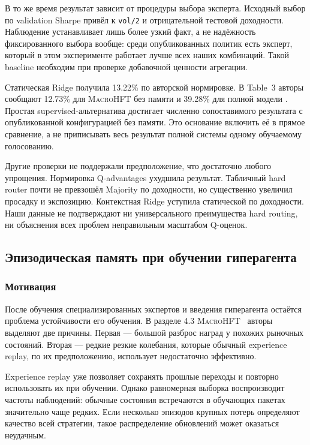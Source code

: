 \documentclass[9pt,a4paper,twocolumn]{extarticle}
\newcommand{\Macro}{\textsc{MacroHFT}}
\begin{document}
В то же время результат зависит от процедуры выбора эксперта. Исходный выбор по validation
Sharpe привёл к \texttt{vol/2} и отрицательной тестовой доходности. Наблюдение устанавливает
лишь более узкий факт, а не надёжность фиксированного выбора вообще: среди опубликованных
политик есть эксперт, который в этом эксперименте работает лучше всех наших комбинаций. Такой
baseline необходим при проверке добавочной ценности агрегации.

Статическая Ridge получила 13.22\% по авторской нормировке. В Table~3 авторы сообщают 12.73\%
для \Macro{} без памяти и 39.28\% для полной модели \cite{zong2024macrohft}. Простая
supervised-альтернатива достигает численно сопоставимого результата с опубликованной
конфигурацией без памяти. Это основание включить её в прямое сравнение, а не приписывать весь
результат полной системы одному обучаемому голосованию.

Другие проверки не поддержали предположение, что достаточно любого упрощения. Нормировка
Q-advantages ухудшила результат. Табличный hard router почти не превзошёл Majority по
доходности, но существенно увеличил просадку и экспозицию. Контекстная Ridge уступила
статической по доходности. Наши данные не подтверждают ни универсального преимущества hard
routing, ни объяснения всех проблем неправильным масштабом Q-оценок.

\subsection{Эпизодическая память при обучении гиперагента}
\label{sec:memory}

\subsubsection{Мотивация}

После обучения специализированных экспертов и введения гиперагента остаётся проблема
устойчивости его обучения. В разделе 4.3 \Macro{}~\cite{zong2024macrohft} авторы выделяют две
причины. Первая --- большой разброс наград у похожих рыночных состояний. Вторая --- редкие
резкие колебания, которые обычный experience replay, по их предположению, использует
недостаточно эффективно.

Experience replay уже позволяет сохранять прошлые переходы и повторно использовать их при
обучении. Однако равномерная выборка воспроизводит частоты наблюдений: обычные состояния
встречаются в обучающих пакетах значительно чаще редких. Если несколько эпизодов крупных потерь
определяют качество всей стратегии, такое распределение обновлений может оказаться неудачным.
\end{document}
